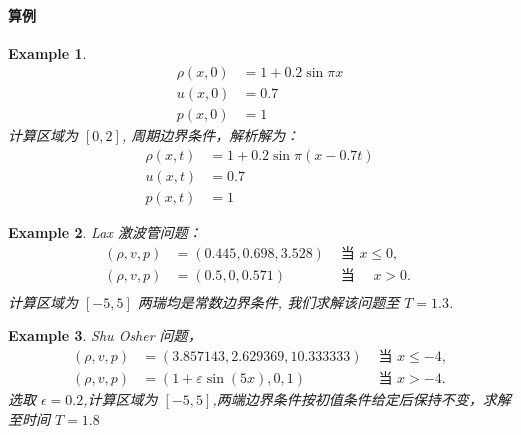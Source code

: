 \documentclass{article}
\newtheorem{example}{Example}
\numberwithin{equation}{subsection}    %
\begin{document}
\begin{appendix}
    \paragraph{算例}
    \begin{example}
        \begin{equation}
            \begin{aligned}
                \rho(x, 0) & =1+0.2 \sin \pi x \\
                u(x, 0)    & =0.7              \\
                p(x, 0)    & =1
            \end{aligned}
        \end{equation}
        计算区域为 $[0,2]$, 周期边界条件，解析解为：
        \begin{equation}
            \begin{aligned}
                \rho(x, t) & =1+0.2 \sin \pi(x-0.7 t) \\
                u(x, t)    & =0.7                     \\
                p(x, t)    & =1
            \end{aligned}
        \end{equation}


    \end{example}
    \begin{example}
        Lax 激波管问题\cite{RN109}：
        \begin{equation}
            \begin{aligned}
                (\rho, v, p) & =(0.445,0.698,3.528) & \text { 当 } x \leqslant 0 \text {, } \\
                (\rho, v, p) & =(0.5,0,0.571) \quad & \text { 当 } \quad x>0 \text {. }     \\
            \end{aligned}
        \end{equation}
        计算区域为 $[-5,5]$ 两瑞均是常数边界条件, 我们求解该问题至 $T=1.3$.
    \end{example}

    \begin{example}
        Shu Osher 问题\cite{RN109}，
        \begin{equation}
            \begin{aligned}
                (\rho, v, p) & =(3.857143,2.629369,10.333333)   & \text { 当 } x \leq-4, \\
                (\rho, v, p) & =(1+\varepsilon \sin (5 x), 0,1) & \text { 当 } x>-4 .
            \end{aligned}
        \end{equation}
        选取 $\epsilon = 0.2$,计算区域为 $[-5,5]$,两端边界条件按初值条件给定后保持不变，求解至时间 $T=1.8$
    \end{example}


\end{appendix}
\end{document}

